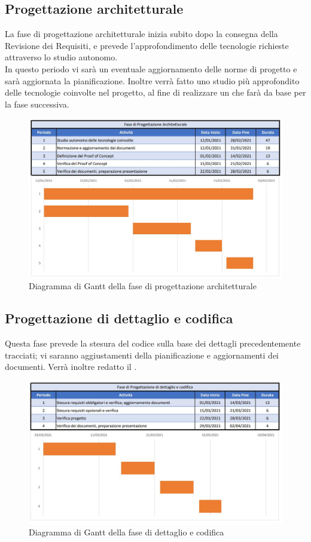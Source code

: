 \documentclass[../piano_di_progetto.tex]{subfiles}
\begin{document}
\subsection{Progettazione architetturale}%
\label{sub:prog_arc}
La fase di progettazione architetturale inizia subito dopo la consegna della Revisione dei Requisiti, e prevede l’approfondimento delle tecnologie richieste attraverso lo studio autonomo. \\
In questo periodo vi sarà un eventuale aggiornamento delle norme di progetto e sarà aggiornata la pianificazione. Inoltre verrà fatto uno studio più approfondito delle tecnologie coinvolte nel progetto, al fine di realizzare un  che farà da base per la fase successiva.

\begin{figure}[H]
\centering
\includegraphics[width=12cm]{fase_prog_archit}
\caption{Diagramma di Gantt della fase di progettazione architetturale}
\end{figure}


\subsection{Progettazione di dettaglio e codifica}%
\label{sub:prog_dett}
Questa fase prevede la stesura del codice sulla base dei dettagli precedentemente tracciati; vi saranno aggiustamenti della pianificazione e aggiornamenti dei documenti. Verrà inoltre redatto il .

\begin{figure}[H]
\centering
\includegraphics[width=12cm]{fase_dett_cod}
\caption{Diagramma di Gantt della fase di dettaglio e codifica}
\end{figure}
\end{document}
